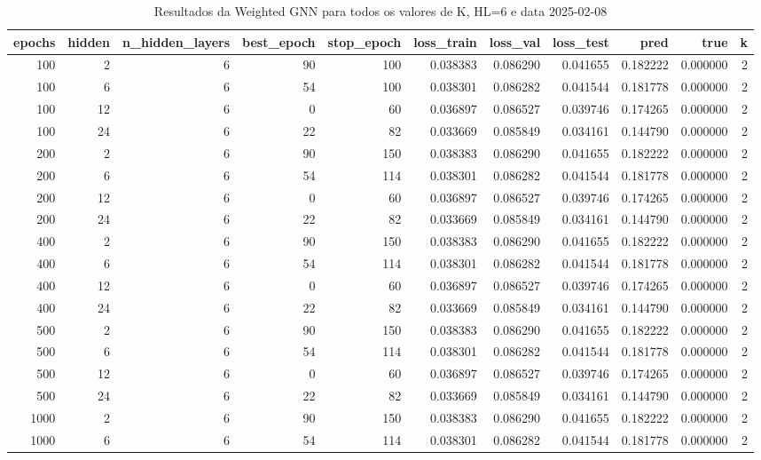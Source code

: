 \begin{table}
\caption{Resultados da Weighted GNN para todos os valores de K, HL=6 e data 2025-02-08}
\label{tab:weighted_gnn_results_allk_hl6_d20250208}
\begin{tabular}{rrrrrrrrrrr}
\toprule
epochs & hidden & n\_hidden\_layers & best\_epoch & stop\_epoch & loss\_train & loss\_val & loss\_test & pred & true & k \\
\midrule
100 & 2 & 6 & 90 & 100 & 0.038383 & 0.086290 & 0.041655 & 0.182222 & 0.000000 & 2 \\
100 & 6 & 6 & 54 & 100 & 0.038301 & 0.086282 & 0.041544 & 0.181778 & 0.000000 & 2 \\
100 & 12 & 6 & 0 & 60 & 0.036897 & 0.086527 & 0.039746 & 0.174265 & 0.000000 & 2 \\
100 & 24 & 6 & 22 & 82 & 0.033669 & 0.085849 & 0.034161 & 0.144790 & 0.000000 & 2 \\
200 & 2 & 6 & 90 & 150 & 0.038383 & 0.086290 & 0.041655 & 0.182222 & 0.000000 & 2 \\
200 & 6 & 6 & 54 & 114 & 0.038301 & 0.086282 & 0.041544 & 0.181778 & 0.000000 & 2 \\
200 & 12 & 6 & 0 & 60 & 0.036897 & 0.086527 & 0.039746 & 0.174265 & 0.000000 & 2 \\
200 & 24 & 6 & 22 & 82 & 0.033669 & 0.085849 & 0.034161 & 0.144790 & 0.000000 & 2 \\
400 & 2 & 6 & 90 & 150 & 0.038383 & 0.086290 & 0.041655 & 0.182222 & 0.000000 & 2 \\
400 & 6 & 6 & 54 & 114 & 0.038301 & 0.086282 & 0.041544 & 0.181778 & 0.000000 & 2 \\
400 & 12 & 6 & 0 & 60 & 0.036897 & 0.086527 & 0.039746 & 0.174265 & 0.000000 & 2 \\
400 & 24 & 6 & 22 & 82 & 0.033669 & 0.085849 & 0.034161 & 0.144790 & 0.000000 & 2 \\
500 & 2 & 6 & 90 & 150 & 0.038383 & 0.086290 & 0.041655 & 0.182222 & 0.000000 & 2 \\
500 & 6 & 6 & 54 & 114 & 0.038301 & 0.086282 & 0.041544 & 0.181778 & 0.000000 & 2 \\
500 & 12 & 6 & 0 & 60 & 0.036897 & 0.086527 & 0.039746 & 0.174265 & 0.000000 & 2 \\
500 & 24 & 6 & 22 & 82 & 0.033669 & 0.085849 & 0.034161 & 0.144790 & 0.000000 & 2 \\
1000 & 2 & 6 & 90 & 150 & 0.038383 & 0.086290 & 0.041655 & 0.182222 & 0.000000 & 2 \\
1000 & 6 & 6 & 54 & 114 & 0.038301 & 0.086282 & 0.041544 & 0.181778 & 0.000000 & 2 \\

\end{tabular}
\end{table}
